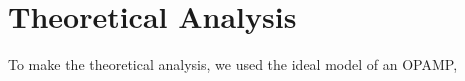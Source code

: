 \section{Theoretical Analysis}
To make the theoretical analysis, we used the ideal model of an OPAMP, 
